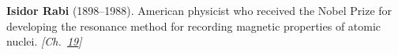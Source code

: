 \nobelphysics \textbf{Isidor Rabi} (1898–1988). American physicist who received the Nobel Prize for developing the resonance method for recording magnetic properties of atomic nuclei. \emph{[Ch.~\hyperref[ch:cosmicraymuons]{19}]}

